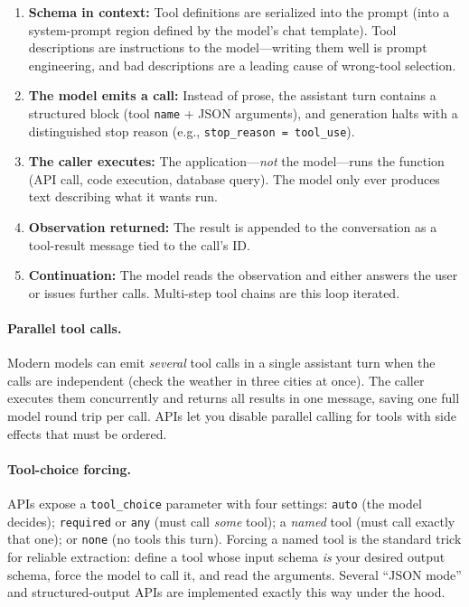 \begin{enumerate}[leftmargin=*]
\item \textbf{Schema in context:} Tool definitions are serialized into the
  prompt (into a system-prompt region defined by the model's chat template).
  Tool descriptions are instructions to the model---writing them well is
  prompt engineering, and bad descriptions are a leading cause of wrong-tool
  selection.
\item \textbf{The model emits a call:} Instead of prose, the assistant turn
  contains a structured block (tool \texttt{name} + JSON arguments), and
  generation halts with a distinguished stop reason (e.g.,
  \texttt{stop\_reason = tool\_use}).
\item \textbf{The caller executes:} The application---\emph{not} the
  model---runs the function (API call, code execution, database query).
  The model only ever produces text describing what it wants run.
\item \textbf{Observation returned:} The result is appended to the
  conversation as a tool-result message tied to the call's ID.
\item \textbf{Continuation:} The model reads the observation and either
  answers the user or issues further calls.  Multi-step tool chains are
  this loop iterated.
\end{enumerate}

\paragraph{Parallel tool calls.}
Modern models can emit \emph{several} tool calls in a single assistant turn
when the calls are independent (check the weather in three cities at once).
The caller executes them concurrently and returns all results in one
message, saving one full model round trip per call.  APIs let you disable
parallel calling for tools with side effects that must be ordered.

\paragraph{Tool-choice forcing.}
APIs expose a \texttt{tool\_choice} parameter with four settings:
\texttt{auto} (the model decides); \texttt{required} or \texttt{any}
(must call \emph{some} tool); a \emph{named} tool (must call exactly that
one); or \texttt{none} (no tools this turn).  Forcing
a named tool is the standard trick for reliable extraction: define a tool
whose input schema \emph{is} your desired output schema, force the model to
call it, and read the arguments.  Several ``JSON mode'' and
structured-output APIs are implemented exactly this way under the hood.

